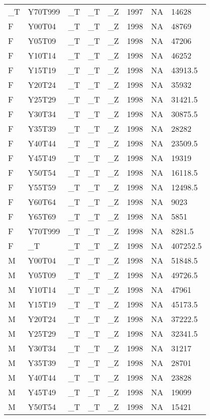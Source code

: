 \begin{longtable}[t]{llllllll}
\addlinespace
\_T & Y70T999 & \_T & \_T & \_Z & 1997 & NA & 14628\\
F & Y00T04 & \_T & \_T & \_Z & 1998 & NA & 48769\\
F & Y05T09 & \_T & \_T & \_Z & 1998 & NA & 47206\\
F & Y10T14 & \_T & \_T & \_Z & 1998 & NA & 46252\\
F & Y15T19 & \_T & \_T & \_Z & 1998 & NA & 43913.5\\
\addlinespace
F & Y20T24 & \_T & \_T & \_Z & 1998 & NA & 35932\\
F & Y25T29 & \_T & \_T & \_Z & 1998 & NA & 31421.5\\
F & Y30T34 & \_T & \_T & \_Z & 1998 & NA & 30875.5\\
F & Y35T39 & \_T & \_T & \_Z & 1998 & NA & 28282\\
F & Y40T44 & \_T & \_T & \_Z & 1998 & NA & 23509.5\\
\addlinespace
F & Y45T49 & \_T & \_T & \_Z & 1998 & NA & 19319\\
F & Y50T54 & \_T & \_T & \_Z & 1998 & NA & 16118.5\\
F & Y55T59 & \_T & \_T & \_Z & 1998 & NA & 12498.5\\
F & Y60T64 & \_T & \_T & \_Z & 1998 & NA & 9023\\
F & Y65T69 & \_T & \_T & \_Z & 1998 & NA & 5851\\
\addlinespace
F & Y70T999 & \_T & \_T & \_Z & 1998 & NA & 8281.5\\
F & \_T & \_T & \_T & \_Z & 1998 & NA & 407252.5\\
M & Y00T04 & \_T & \_T & \_Z & 1998 & NA & 51848.5\\
M & Y05T09 & \_T & \_T & \_Z & 1998 & NA & 49726.5\\
M & Y10T14 & \_T & \_T & \_Z & 1998 & NA & 47961\\
\addlinespace
M & Y15T19 & \_T & \_T & \_Z & 1998 & NA & 45173.5\\
M & Y20T24 & \_T & \_T & \_Z & 1998 & NA & 37222.5\\
M & Y25T29 & \_T & \_T & \_Z & 1998 & NA & 32341.5\\
M & Y30T34 & \_T & \_T & \_Z & 1998 & NA & 31217\\
M & Y35T39 & \_T & \_T & \_Z & 1998 & NA & 28701\\
\addlinespace
M & Y40T44 & \_T & \_T & \_Z & 1998 & NA & 23828\\
M & Y45T49 & \_T & \_T & \_Z & 1998 & NA & 19099\\
M & Y50T54 & \_T & \_T & \_Z & 1998 & NA & 15421\\

\end{longtable}
